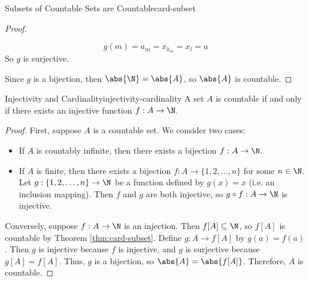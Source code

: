 \begin{thmbox}{Subsets of Countable Sets are Countable}{card-subset}
\begin{proof}
\begin{itemize}
            \[ g(m) = a_m = x_{k_m} = x_l = a \]
            So $g$ is surjective.
        \end{itemize}
        Since $g$ is a bijection, then $\abs{\N} = \abs{A}$, so $\abs{A}$ is countable.
    \end{proof}
\end{thmbox}

\begin{thmbox}{Injectivity and Cardinality}{injectivity-cardinality}
    A set $A$ is countable if and only if there exists an injective function $f : A \to \N$.
    \tcblower
    \begin{proof}
        First, suppose $A$ is a countable set. We consider two cases:
        \begin{itemize}
            \item If $A$ is countably infinite, then there exists a bijection $f : A \to \N$.
            \item If $A$ is finite, then there exists a bijection $f : A \to \{1,2,\ldots,n\}$ for some $n \in \N$. Let $g : \{1,2,\ldots,n\} \to \N$ be a function defined by $g(x) = x$ (i.e. an inclusion mapping). Then $f$ and $g$ are both injective, so $g \circ f : A \to \N $ is injective.
        \end{itemize}

        Conversely, suppose $f : A \to \N$ is an injection. Then $f[A] \subseteq \N$, so $f[A]$ is countable by Theorem \ref{thm:card-subset}. Define $g : A \to f[A]$ by $g(a) = f(a)$. Then $g$ is injective because $f$ is injective, and $g$ is surjective because $g[A] = f[A]$. Thus, $g$ is a bijection, so $\abs{A} = \abs{f[A]}$. Therefore, $A$ is countable.
    \end{proof}
\end{thmbox}

